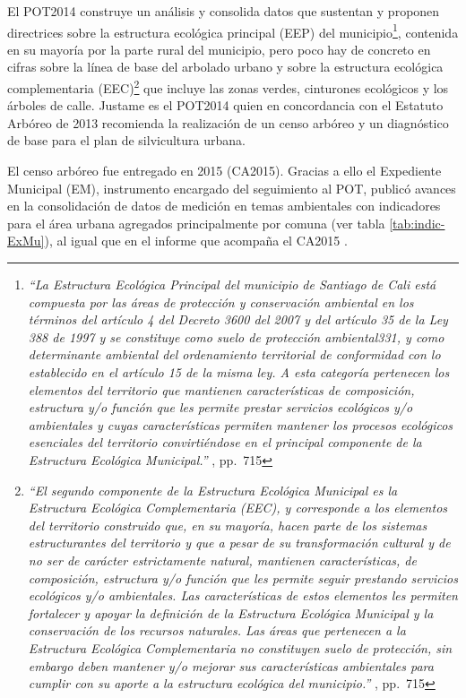 \documentclass[12pt,]{book}
\let\rmarkdownfootnote\footnote%
\def\footnote{\protect\rmarkdownfootnote}
\begin{document}
El POT2014 construye un análisis y consolida datos que sustentan y
proponen directrices sobre la estructura ecológica principal (EEP) del
municipio\footnote{\emph{``La Estructura Ecológica Principal del
  municipio de Santiago de Cali está compuesta por las áreas de
  protección y conservación ambiental en los términos del artículo 4 del
  Decreto 3600 del 2007 y del artículo 35 de la Ley 388 de 1997 y se
  constituye como suelo de protección ambiental331, y como determinante
  ambiental del ordenamiento territorial de conformidad con lo
  establecido en el artículo 15 de la misma ley. A esta categoría
  pertenecen los elementos del territorio que mantienen características
  de composición, estructura y/o función que les permite prestar
  servicios ecológicos y/o ambientales y cuyas características permiten
  mantener los procesos ecológicos esenciales del territorio
  convirtiéndose en el principal componente de la Estructura Ecológica
  Municipal.''} \citet{noauthor_plan_nodate}, pp.~715}, contenida en su
mayoría por la parte rural del municipio, pero poco hay de concreto en
cifras sobre la línea de base del arbolado urbano y sobre la estructura
ecológica complementaria (EEC)\footnote{\emph{``El segundo componente de
  la Estructura Ecológica Municipal es la Estructura Ecológica
  Complementaria (EEC), y corresponde a los elementos del territorio
  construido que, en su mayoría, hacen parte de los sistemas
  estructurantes del territorio y que a pesar de su transformación
  cultural y de no ser de carácter estrictamente natural, mantienen
  características, de composición, estructura y/o función que les
  permite seguir prestando servicios ecológicos y/o ambientales. Las
  características de estos elementos les permiten fortalecer y apoyar la
  definición de la Estructura Ecológica Municipal y la conservación de
  los recursos naturales. Las áreas que pertenecen a la Estructura
  Ecológica Complementaria no constituyen suelo de protección, sin
  embargo deben mantener y/o mejorar sus características ambientales
  para cumplir con su aporte a la estructura ecológica del municipio.''}
  \citet{noauthor_plan_nodate}, pp.~715} que incluye las zonas verdes,
cinturones ecológicos y los árboles de calle. Justame es el POT2014
quien en concordancia con el Estatuto Arbóreo de 2013
\citep{noauthor_estatuo_2013} recomienda la realización de un censo
arbóreo y un diagnóstico de base para el plan de silvicultura urbana.

El censo arbóreo fue entregado en 2015 (CA2015). Gracias a ello el
Expediente Municipal (EM), instrumento encargado del seguimiento al POT,
publicó avances en la consolidación de datos de medición en temas
ambientales con indicadores para el área urbana agregados principalmente
por comuna (ver tabla \ref{tab:indic-ExMu}), al igual que en el informe
que acompaña el CA2015 \citep{noauthor_informes_2015}.
\end{document}
